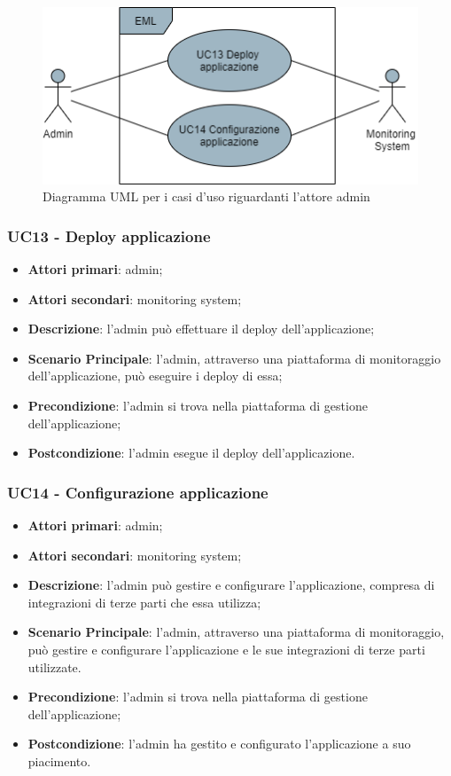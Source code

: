 \begin{figure}[H]
\centering
\includegraphics[scale=0.6]{res/UseCase/Immagini/Admin}
\caption{Diagramma UML per i casi d'uso riguardanti l'attore admin}
\end{figure}

\subsubsection{UC13 - Deploy applicazione}
\begin{itemize}
\item \textbf{Attori primari}: admin;
\item \textbf{Attori secondari}: monitoring system;
\item \textbf{Descrizione}: l'admin può effettuare il deploy dell'applicazione;
\item \textbf{Scenario Principale}: l'admin, attraverso una piattaforma di monitoraggio dell'applicazione, può eseguire i deploy di essa;
\item \textbf{Precondizione}: l'admin si trova nella piattaforma di gestione dell'applicazione;
\item \textbf{Postcondizione}: l'admin esegue il deploy dell'applicazione.
\end{itemize}

\subsubsection{UC14 - Configurazione applicazione}
\begin{itemize}
\item \textbf{Attori primari}: admin;
\item \textbf{Attori secondari}: monitoring system;
\item \textbf{Descrizione}: l'admin può gestire e configurare l'applicazione, compresa di integrazioni di terze parti che essa utilizza;
\item \textbf{Scenario Principale}: l'admin, attraverso una piattaforma di monitoraggio, può gestire e configurare l'applicazione e le sue integrazioni di terze parti utilizzate.
\item \textbf{Precondizione}: l'admin si trova nella piattaforma di gestione dell'applicazione;
\item \textbf{Postcondizione}: l'admin ha gestito e configurato l'applicazione a suo piacimento.
\end{itemize}

